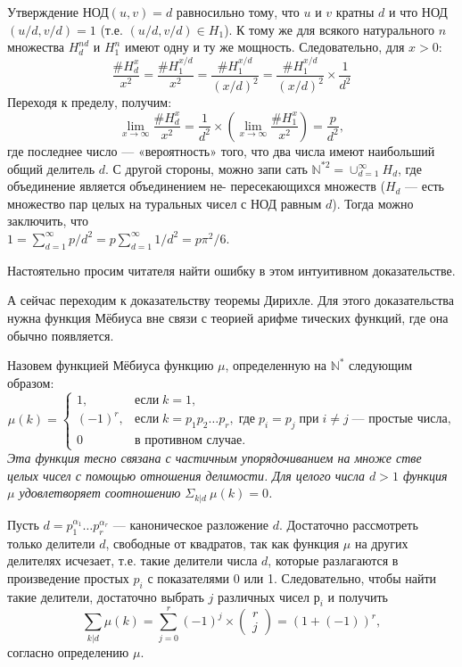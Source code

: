 \documentclass{mai_book}
\begin{document}
\begin{myproof}
Утверждение НОД$(u,v) = d$ равносильно тому, что $u$ и $v$ кратны
$d$ и что НОД$(u/d,v/d) = 1$ (т.е. $(u/d,v/d)\in H_{1}$). К тому же для
всякого натурального $n$ множества $H_{d}^{nd}$ и  $H_{1}^n$ имеют одну и ту же
мощность. Следовательно, для $x > 0$:
$$\frac{\#H_{d}^x}{x^2}=\frac{\#H_{1}^{x/d}}{x^2}=\frac{\#H_{1}^{x/d}}{(x/d)^2}=\frac{\#H_{1}^{x/d}}{(x/d)^2}\times\frac{1}{d^2}$$
Переходя к пределу, получим:
$$\lim\limits_{x\to\infty}\frac{\#H_{d}^x}{x^2}=\frac{1}{d^2}\times\left(\lim\limits_{x\to\infty}\frac{\#H_{1}^x}{x^2} \right) = \frac{p}{d^2},$$
где последнее число — «вероятность» того, что два числа имеют
наибольший общий делитель $d$. С другой стороны, можно запи­
сать $\mathbb{N}^{*2}=\cup_{d=1}^{\infty}H_{d}$, где
 объединение является объединением не-
пересекающихся множеств ($H_{d}$ — есть множество пар целых на­
туральных чисел с НОД равным $d$). Тогда можно заключить, что\\
$1 =\sum\nolimits_{d=1}^{\infty} p/d^2 = p\sum\nolimits_{d=1}^{\infty}1/d^2=p\pi^2/6$.
\end{myproof}

Настоятельно просим читателя найти ошибку в этом интуитивном
доказательстве.

А сейчас переходим к доказательству теоремы Дирихле. Для этого
доказательства нужна функция Мёбиуса вне связи с теорией арифме­
тических функций, где она обычно появляется.

\begin{property}
\hspace*{0.5cm}Назовем функцией Мёбиуса функцию $\mu$, определенную на $\mathbb{N}^{*}$ следу­ющим образом:
$$\mu(k)=
\left\lbrace
\begin{array}{ll}
1,&\text{если}\;k=1,\\
(-1)^r,&\text{если}\;k=p_{1}p_{2}\ldots p_{r},\;\text{где}\;p_{i}=p_{j}\;\text{при}\;i\neq j\;\text{— простые числа,}\\
0&\text{в противном случае.}
\end{array}
\right.$$
\textit{Эта функция тесно связана с частичным упорядочиванием на множе­
стве целых чисел с помощью отношения делимости. Для целого числа
$d>1$ функция $\mu$ удовлетворяет соотношению $\Sigma_{k|d}\:\mu(k)=0$.}
\end{property}
\begin{myproof}
Пусть $d=p_{1}^{\alpha_{1}}\ldots p_{r}^{\alpha_{r}}$
 — каноническое разложение $d$. Достаточно
рассмотреть только делители $d$, свободные от квадратов, так как
функция $\mu$ на других делителях исчезает, т.е. такие делители числа
$d$, которые разлагаются в произведение простых $p_{i}$ с показателями
0 или 1. Следовательно, чтобы найти такие делители, достаточно
выбрать $j$ различных чисел $р_{i}$ и получить
$$\sum\limits_{k|d}\mu(k)=\sum\limits_{j=0}^r(-1)^j\times
\left(\begin{array}{c}
r\\
j
\end{array}\right)
=(1+(-1))^r,$$
согласно определению $\mu$.
\end{myproof}
\end{document}

